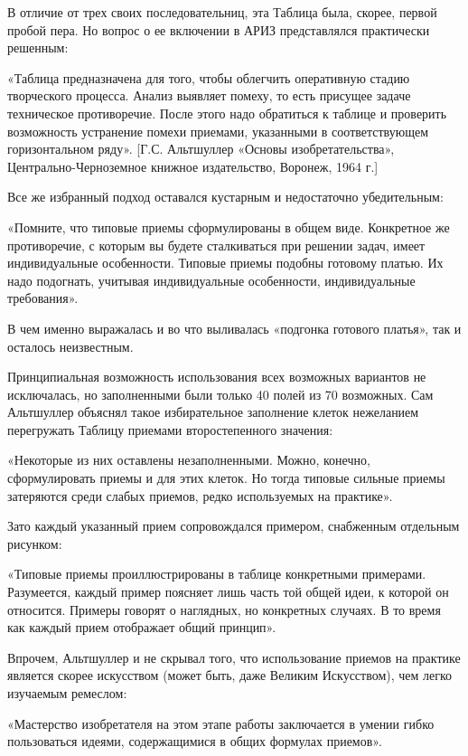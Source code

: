 \documentclass[11pt,a4paper]{article}
\begin{document}
В отличие от трех своих последовательниц, эта Таблица была, скорее, первой
пробой пера. Но вопрос о ее включении в АРИЗ представлялся практически
решенным:

«Таблица предназначена для того, чтобы облегчить оперативную стадию
творческого процесса. Анализ выявляет помеху, то есть присущее задаче
техническое противоречие. После этого надо обратиться к таблице и проверить
возможность устранение помехи приемами, указанными в соответствующем
горизонтальном ряду». [Г.С. Альтшуллер «Основы изобретательства»,
  Центрально-Черноземное книжное издательство, Воронеж, 1964 г.]

Все же избранный подход оставался кустарным и недостаточно убедительным:

«Помните, что типовые приемы сформулированы в общем виде. Конкретное же
противоречие, с которым вы будете сталкиваться при решении задач, имеет
индивидуальные особенности. Типовые приемы подобны готовому платью. Их надо
подогнать, учитывая индивидуальные особенности, индивидуальные требования».

В чем именно выражалась и во что выливалась «подгонка готового платья», так и
осталось неизвестным.

Принципиальная возможность использования всех возможных вариантов не
исключалась, но заполненными были только 40 полей из 70 возможных. Сам
Альтшуллер объяснял такое избирательное заполнение клеток нежеланием
перегружать Таблицу приемами второстепенного значения:

«Некоторые из них оставлены незаполненными. Можно, конечно, сформулировать
приемы и для этих клеток. Но тогда типовые сильные приемы затеряются среди
слабых приемов, редко используемых на практике».

Зато каждый указанный прием сопровождался примером, снабженным отдельным
рисунком:

«Типовые приемы проиллюстрированы в таблице конкретными примерами. Разумеется,
каждый пример поясняет лишь часть той общей идеи, к которой он
относится. Примеры говорят о наглядных, но конкретных случаях. В то время как
каждый прием отображает общий принцип».

Впрочем, Альтшуллер и не скрывал того, что использование приемов на практике
является скорее искусством (может быть, даже Великим Искусством), чем легко
изучаемым ремеслом:

«Мастерство изобретателя на этом этапе работы заключается в умении гибко
пользоваться идеями, содержащимися в общих формулах приемов».
\end{document}

